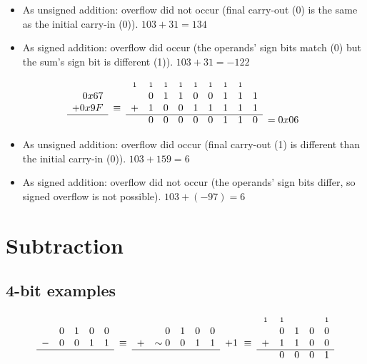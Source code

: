 \documentclass{article}
\newcommand{\carry}{\scriptstyle 1}
\begin{document}
\begin{itemize}
\item As unsigned addition: overflow did not occur (final carry-out (0) is the
    same as the initial carry-in (0)). $103+31=134$
\item As signed addition: overflow did occur (the operands' sign bits match (0)
    but the sum's sign bit is different (1)). $103+31=-122$
\end{itemize}

\begin{equation*}\begin{array}{rccccccccccl}
       &        & \carry & \carry & \carry & \carry & \carry & \carry & \carry & \carry &  & \\
  0x67 &        &   & 0 & 1 & 1 & 0 & 0 & 1 & 1 & 1 & \\
+ 0x9F & \equiv & + & 1 & 0 & 0 & 1 & 1 & 1 & 1 & 1 & \\ \cline{1-1}\cline{3-11}
       &        &   & 0 & 0 & 0 & 0 & 0 & 1 & 1 & 0 & = 0x06
\end{array}\end{equation*}

\begin{itemize}
\item As unsigned addition: overflow did occur (final carry-out (1) is
    different than the initial carry-in (0)). $103+159=6$
\item As signed addition: overflow did not occur (the operands' sign bits
    differ, so signed overflow is not possible). $103+(-97)=6$
\end{itemize}


\section{Subtraction}

\subsection{4-bit examples}

\begin{equation*}\begin{array}{cccccccrcclcccccc}
  &   &   &   &   &        &   &   &   &   &   &            & \carry & \carry & & & \carry \\
  & 0 & 1 & 0 & 0 &        &   & 0 & 1 & 0 & 0 &            &   & 0 & 1 & 0 & 0 \\
- & 0 & 0 & 1 & 1 & \equiv & + &\sim 0 &0&1& 1 & + 1\ \equiv & + & 1 & 1 & 0 & 0 \\ \cline{1-5}\cline{7-11}\cline{13-17}
  &   &   &   &   &        &   &   &   &   &   &            &   & 0 & 0 & 0 & 1
\end{array}\end{equation*}
\end{document}
